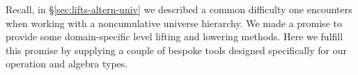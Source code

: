 Recall, in \S\ref{sec:lifts-altern-univ} we described a common difficulty one encounters when working with a noncumulative universe hierarchy. We made a promise to provide some domain-specific level lifting and lowering methods. Here we fulfill this promise by supplying a couple of bespoke tools designed specifically for our operation and algebra types.
\ccpad
\begin{code}%
\>[0][@{}l@{\AgdaIndent{0}}]%
\>[1]\AgdaSpace{}%
\AgdaSymbol{:}\AgdaSpace{}%
\AgdaSymbol{((}\AgdaSpace{}%
\AgdaSpace{}%
\AgdaSymbol{)}\AgdaSpace{}%
\AgdaSpace{}%
\AgdaSymbol{)}\AgdaSpace{}%
\AgdaSpace{}%
\AgdaSymbol{(}\AgdaSpace{}%
\AgdaSymbol{:}\AgdaSpace{}%
\AgdaSymbol{)}\AgdaSpace{}%
\AgdaSpace{}%
\AgdaSymbol{((}\AgdaSpace{}%
\AgdaSpace{}%
\AgdaSymbol{\{}\AgdaSymbol{\}}\AgdaSpace{}%
\AgdaSymbol{)}\AgdaSpace{}%
\AgdaSpace{}%
\AgdaSpace{}%
\AgdaSymbol{\{}\AgdaSymbol{\}}\AgdaSpace{}%
\AgdaSymbol{)}\<%
\\
%
\>[1]\AgdaSpace{}%
\AgdaSpace{}%
\AgdaSpace{}%
\AgdaSymbol{=}\AgdaSpace{}%
\AgdaSpace{}%
\AgdaSpace{}%
\AgdaSpace{}%
\AgdaSpace{}%
\AgdaSymbol{(}\AgdaSpace{}%
\AgdaSpace{}%
\AgdaSpace{}%
\AgdaSpace{}%
\AgdaSpace{}%
\AgdaSymbol{(}\AgdaSpace{}%
\AgdaSymbol{)))}\<%
\\
%
\\[\AgdaEmptyExtraSkip]%

\end{code}
